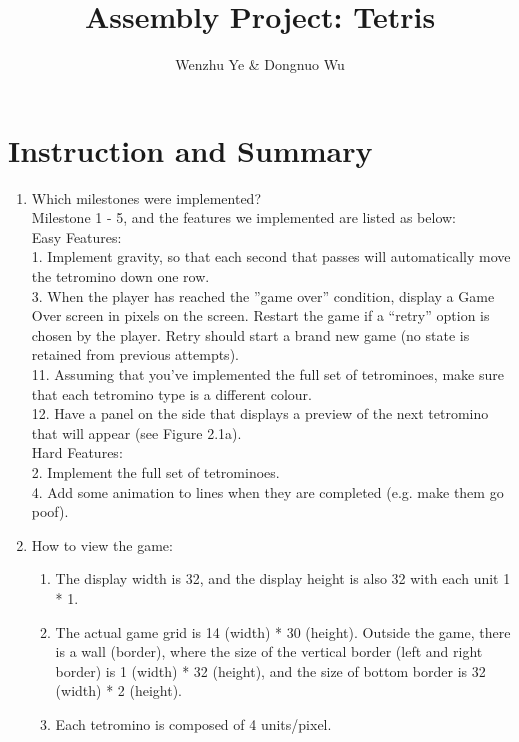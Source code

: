 \documentclass{article}
\title{Assembly Project: Tetris}
\author{Wenzhu Ye & Dongnuo Wu}
\begin{document}
\maketitle

\section{Instruction and Summary}

\begin{enumerate}

    \item Which milestones were implemented? \\
    Milestone 1 - 5, and the features we implemented are listed as below:\\
    Easy Features:\\
    1. Implement gravity, so that each second that passes will automatically move the tetromino down 
one row.\\
    3. When the player has reached the ”game over” condition, display a Game Over screen in pixels
on the screen. Restart the game if a “retry” option is chosen by the player. Retry should start a
brand new game (no state is retained from previous attempts).\\
    11. Assuming that you’ve implemented the full set of tetrominoes, make sure that each tetromino
type is a different colour.\\
    12. Have a panel on the side that displays a preview of the next tetromino that will appear (see
Figure 2.1a).\\
    Hard Features:\\
    2. Implement the full set of tetrominoes.\\
    4. Add some animation to lines when they are completed (e.g. make them go poof).\\


    \item How to view the game:
    
    \begin{enumerate}

    \item The display width is 32, and the display height is also 32 with each unit 1 * 1.
    \item The actual game grid is 14 (width) * 30 (height). Outside the game, there is a wall (border), where the size of the vertical border (left and right border) is 1 (width) * 32 (height), and the size of bottom border is 32 (width) * 2 (height).
    \item Each tetromino is composed of 4 units/pixel.



\end{enumerate}
\end{enumerate}
\end{document}
